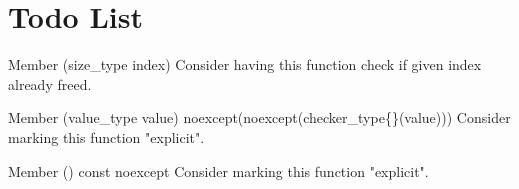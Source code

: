 \chapter{Todo List}
\hypertarget{todo}{}\label{todo}

\begin{DoxyRefList}
\item[Member \doxylink{classplayrho_1_1ArrayAllocator_ab4740267ab2704193a2b9119f2609930}{playrho\+::Array\+Allocator\texorpdfstring{$<$}{<} T \texorpdfstring{$>$}{>}\+::Free} (size\+\_\+type index)]\label{todo__todo000001}%
%
Consider having this function check if given index already freed.  
\item[Member \doxylink{classplayrho_1_1CheckedValue_ae90f335daecd90e9c249b4811a0807dc}{playrho\+::Checked\+Value\texorpdfstring{$<$}{<} Value\+Type, Checker\+Type \texorpdfstring{$>$}{>}\+::Checked\+Value} (value\+\_\+type value) noexcept(noexcept(checker\+\_\+type\{\}(value)))]\label{todo__todo000002}%
%
Consider marking this function "{}explicit"{}.  
\item[Member \doxylink{classplayrho_1_1CheckedValue_a8dfc68564f17eae760e416e7b45b81b1}{playrho\+::Checked\+Value\texorpdfstring{$<$}{<} Value\+Type, Checker\+Type \texorpdfstring{$>$}{>}\+::operator value\+\_\+type} () const noexcept]\label{todo__todo000003}%
%
Consider marking this function "{}explicit"{}. 
\end{DoxyRefList}